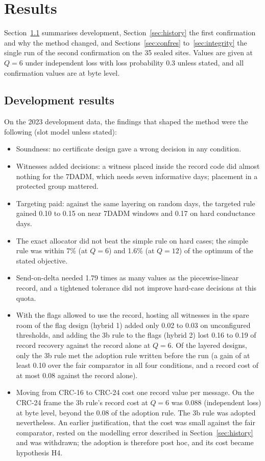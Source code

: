 ﻿\section{Results}
\label{sec:results}

Section~\ref{sec:devres} summarises development, Section~\ref{sec:history} the first confirmation and why the method changed, and Sections~\ref{sec:confres} to~\ref{sec:integrity} the single run of the second confirmation on the 35 sealed sites. Values are given at $Q = 6$ under independent loss with loss probability 0.3 unless stated, and all confirmation values are at byte level.

\subsection{Development results}
\label{sec:devres}
On the 2023 development data, the findings that shaped the method were the following (slot model unless stated):
\begin{itemize}
  \item Soundness: no certificate design gave a wrong decision in any condition.
  \item Witnesses added decisions: a witness placed inside the record code did almost nothing for the 7DADM, which needs seven informative days; placement in a protected group mattered.
  \item Targeting paid: against the same layering on random days, the targeted rule gained 0.10 to 0.15 on near 7DADM windows and 0.17 on hard conductance days.
  \item The exact allocator did not beat the simple rule on hard cases; the simple rule was within 7\% (at $Q = 6$) and 1.6\% (at $Q = 12$) of the optimum of the stated objective.
  \item Send-on-delta needed 1.79 times as many values as the piecewise-linear record, and a tightened tolerance did not improve hard-case decisions at this quota.
  \item With the flags allowed to use the record, hosting all witnesses in the spare room of the flag design (hybrid 1) added only 0.02 to 0.03 on unconfigured thresholds, and adding the 3b rule to the flags (hybrid 2) lost 0.16 to 0.19 of record recovery against the record alone at $Q = 6$. Of the layered designs, only the 3b rule met the adoption rule written before the run (a gain of at least 0.10 over the fair comparator in all four conditions, and a record cost of at most 0.08 against the record alone).
  \item Moving from CRC-16 to CRC-24 cost one record value per message. On the CRC-24 frame the 3b rule's record cost at $Q = 6$ was 0.088 (independent loss) at byte level, beyond the 0.08 of the adoption rule. The 3b rule was adopted nevertheless. An earlier justification, that the cost was small against the fair comparator, rested on the modelling error described in Section~\ref{sec:history} and was withdrawn; the adoption is therefore post hoc, and its cost became hypothesis H4.
\end{itemize}


